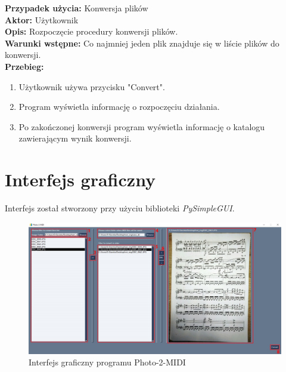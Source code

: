 \noindent \textbf{Przypadek użycia:} Konwersja plików\\
\textbf{Aktor:} Użytkownik\\
\textbf{Opis:} Rozpoczęcie procedury konwersji plików.\\
\textbf{Warunki wstępne:} Co najmniej jeden plik znajduje się w liście plików do konwersji.\\
\textbf{Przebieg:}
\begin{enumerate}
	\item Użytkownik używa przycisku "Convert".
	\item Program wyświetla informację o rozpoczęciu działania.
	\item Po zakończonej konwersji program wyświetla informację o katalogu zawierającym wynik konwersji.
\end{enumerate}





\section{Interfejs graficzny}

Interfejs został stworzony przy użyciu biblioteki \textit{PySimpleGUI}.

\begin{figure}[h]
	\centering
	\includegraphics[width=16cm]{images/gui}
	\caption{Interfejs graficzny programu Photo-2-MIDI}
	\label{fig:gui}
\end{figure}

